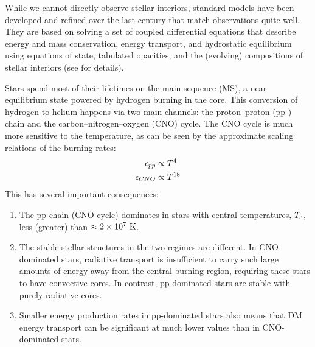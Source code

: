 \documentclass[useAMS,usenatbib]{mnras}
\begin{document}
  While we cannot directly observe stellar interiors, standard models have been developed and refined over the last century that match observations quite well. They are based on solving a set of coupled differential equations that describe energy and mass conservation, energy transport, and hydrostatic equilibrium using equations of state, tabulated opacities, and the (evolving) compositions of stellar interiors (see \citealt{Pols1990StellarEvolution} for details).

  Stars spend most of their lifetimes on the main sequence (MS), a near equilibrium state powered by hydrogen burning in the core. This conversion of hydrogen to helium happens via two main channels: the proton–proton (pp-) chain and the carbon–nitrogen–oxygen (CNO) cycle. The CNO cycle is much more sensitive to the temperature, as can be seen by the approximate scaling relations of the burning rates:
  \begin{align}
    \epsilon_{pp} &\propto T^4 \\
    \epsilon_{CNO} &\propto T^{18}
  \end{align}
  This has several important consequences:
  \begin{enumerate}
    \item The pp-chain (CNO cycle) dominates in stars with central temperatures, $T_c$, less (greater) than $\approx 2 \times 10^7 \ \mathrm{K}$.

    \item The stable stellar structures in the two regimes are different. In CNO-dominated stars, radiative transport is insufficient to carry such large amounts of energy away from the central burning region, requiring these stars to have convective cores. In contrast, pp-dominated stars are stable with purely radiative cores.

    \item Smaller energy production rates in pp-dominated stars also means that DM energy transport can be significant at much lower values than in CNO-dominated stars.
  \end{enumerate}
\end{document}
